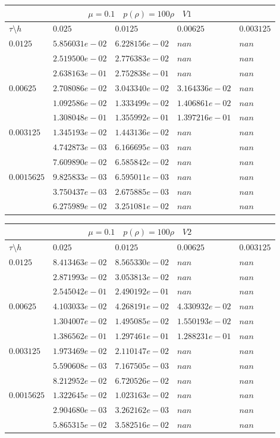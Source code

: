 \documentclass[a4paper,12pt]{extarticle}
\begin{document}
\begin{tabular}{|l|l|l|l|l|}
	\hline
	\multicolumn{5}{|c|}{$\mu =0.1 \quad  p(\rho) =100 \rho \quad V1$}\\
	\hline
	$\tau\setminus h$ & $0.025$ & $0.0125$ & $0.00625$ & $0.003125$\\
	\hline
	$0.0125$  & $5.856031e-02$ & $6.228156e-02$ & $nan$ & $nan$\\
	& $2.519500e-02$ & $2.776383e-02$ & $nan$ & $nan$\\
	& $2.638163e-01$ & $2.752838e-01$ & $nan$ & $nan$\\
	\hline
	$0.00625$  & $2.708086e-02$ & $3.043340e-02$ & $3.164336e-02$ & $nan$\\
	& $1.092586e-02$ & $1.333499e-02$ & $1.406861e-02$ & $nan$\\
	& $1.308048e-01$ & $1.355992e-01$ & $1.397216e-01$ & $nan$\\
	\hline
	$0.003125$  & $1.345193e-02$ & $1.443136e-02$ & $nan$ & $nan$\\
	& $4.742873e-03$ & $6.166695e-03$ & $nan$ & $nan$\\
	& $7.609890e-02$ & $6.585842e-02$ & $nan$ & $nan$\\
	\hline
	$0.0015625$  & $9.825833e-03$ & $6.595011e-03$ & $nan$ & $nan$\\
	& $3.750437e-03$ & $2.675885e-03$ & $nan$ & $nan$\\
	& $6.275989e-02$ & $3.251081e-02$ & $nan$ & $nan$\\
	\hline
\end{tabular}

\begin{tabular}{|l|l|l|l|l|}
	\hline
	\multicolumn{5}{|c|}{$\mu =0.1 \quad  p(\rho) =100 \rho \quad V2$}\\
	\hline
	$\tau\setminus h$ & $0.025$ & $0.0125$ & $0.00625$ & $0.003125$\\
	\hline
	$0.0125$  & $8.413463e-02$ & $8.565330e-02$ & $nan$ & $nan$\\
	& $2.871993e-02$ & $3.053813e-02$ & $nan$ & $nan$\\
	& $2.545042e-01$ & $2.490192e-01$ & $nan$ & $nan$\\
	\hline
	$0.00625$  & $4.103033e-02$ & $4.268191e-02$ & $4.330932e-02$ & $nan$\\
	& $1.304007e-02$ & $1.495085e-02$ & $1.550193e-02$ & $nan$\\
	& $1.386562e-01$ & $1.297461e-01$ & $1.288231e-01$ & $nan$\\
	\hline
	$0.003125$  & $1.973469e-02$ & $2.110147e-02$ & $nan$ & $nan$\\
	& $5.590608e-03$ & $7.167505e-03$ & $nan$ & $nan$\\
	& $8.212952e-02$ & $6.720526e-02$ & $nan$ & $nan$\\
	\hline
	$0.0015625$  & $1.322645e-02$ & $1.023163e-02$ & $nan$ & $nan$\\
	& $2.904680e-03$ & $3.262162e-03$ & $nan$ & $nan$\\
	& $5.865315e-02$ & $3.582516e-02$ & $nan$ & $nan$\\
	\hline
\end{tabular}
\end{document}
